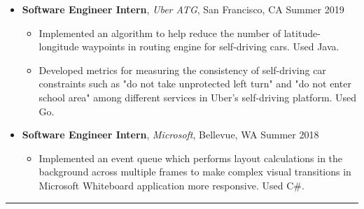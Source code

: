 \documentclass[10pt,letterpaper]{article}
\begin{document}
\begin{itemize}
\begin{itemize}[label=\textbullet]
    \end{itemize}
    \vspace{0.1em}
    \item[]
    {\textbf{Software Engineer Intern}, \textit{Uber ATG}, San Francisco, CA \hfill {Summer 2019}}
    \begin{itemize}[label=\textbullet]
      \itemsep0.1em
      \item Implemented an algorithm to help reduce the number of
      latitude-longitude waypoints in routing engine for self-driving cars. Used Java.
      \item Developed metrics for measuring the consistency of self-driving car constraints such as "do not take unprotected left turn" and "do not enter school area" among different services in Uber's self-driving platform. Used Go.
    \end{itemize}
    \vspace{0.1em}
    \item[]
    {\textbf{Software Engineer Intern}, \textit{Microsoft}, Bellevue, WA \hfill {Summer 2018}}
    \begin{itemize}[label=\textbullet]
      \itemsep0.1em
      \item Implemented an event queue which performs layout calculations in the background 
      across multiple frames to make complex visual transitions in Microsoft Whiteboard application
      more responsive. Used C\#.
    \end{itemize}


  \end{itemize}

\hrule
\vspace{-0.95em}
\end{document}
